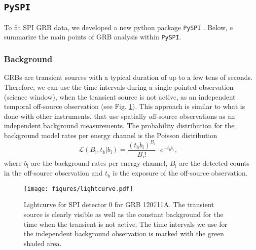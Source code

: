 \documentclass[twocolumn,traditabstract]{aa}
\begin{document}
\subsection{{\tt PySPI}}
\label{pyspi}
To fit SPI GRB data, we developed a new python package {\tt PySPI} \citep{joss}.
Below, e summarize the main points of GRB analysis within {\tt PySPI}.

\subsubsection{Background}

GRBs are transient sources with a typical duration of up to a few tens of seconds. Therefore, we can use the time intervals during a single pointed observation (science window), when the transient source is not active, as an independent temporal off-source observation (see Fig. \ref{fig:lightcurve}). This approach is similar to what is done with other instruments, that use spatially off-source observations as an independent background measurements.
The probability distribution for the background model rates per energy channel is the Poisson distribution
\begin{equation}
	\mathcal{L}(B_{\mathrm{i}}, t_{\mathrm{b}}|b_{\mathrm{i}})=\frac{(t_{\mathrm{b}} b_{\mathrm{i}})^{B_{\mathrm{i}}}}{B_{\mathrm{i}}!}\cdot e^{-t_{\mathrm{b}} b_{\mathrm{i}}},
  \label{eq:poisson_bkg}
\end{equation}
where $b_{\mathrm{i}}$ are the background rates per energy channel, $B_{\mathrm{i}}$ are the detected counts in the off-source observation and $t_{\mathrm{b}}$ is the exposure of the off-source observation.


\begin{figure}
    \begin{centering}
        \texttt{[image: figures/lightcurve.pdf]}
        \caption{Lightcurve for SPI detector 0 for GRB 120711A. The transient source is clearly visible as well as the constant background for the time when the transient is not active. The time intervals we use for the independent background observation is marked with the green shaded area.}
        \label{fig:lightcurve}
    \end{centering}
\end{figure}
\end{document}
